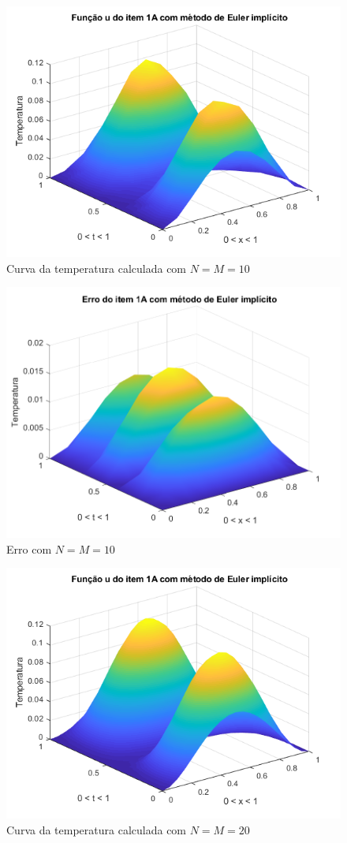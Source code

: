 \documentclass[12pt]{article}
\begin{document}
\begin{spacing}{1.5}
\begin{figure}[ht!]
    \centering
    \includegraphics[width=0.8\linewidth]{Segunda_Tarefa/ItemB/nm10_calculada_A.png}
    \caption{Curva da temperatura calculada com $N=M=10$}
    \label{fig:BA_nm10_calculada}
\end{figure}

\begin{figure}
    \centering
    \includegraphics[width=0.8\linewidth]{Segunda_Tarefa/ItemB/nm10_erro_A.png}
    \caption{Erro com $N=M=10$}
    \label{fig:BA_nm10_erro}
\end{figure}

\begin{figure}
    \centering
    \includegraphics[width=0.8\linewidth]{Segunda_Tarefa/ItemB/nm20_calculada_A.png}
    \caption{Curva da temperatura calculada com $N=M=20$}
    \label{fig:BA_nm20_calculada}
\end{figure}


\end{spacing}
\end{document}
